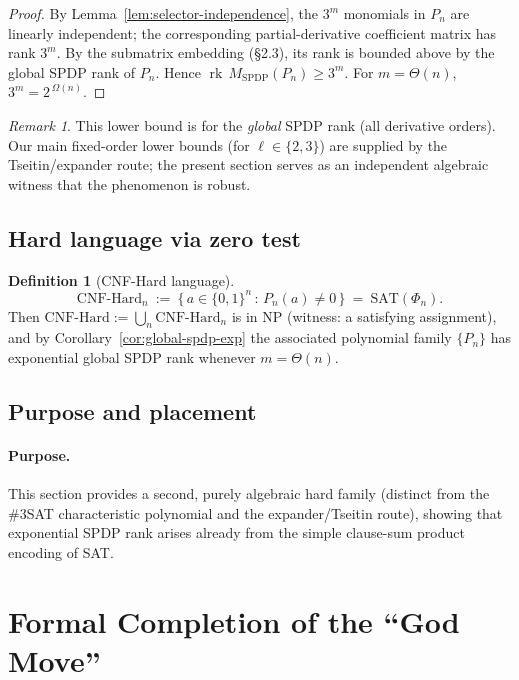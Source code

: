 \documentclass[12pt]{article}
\theoremstyle{definition}
\newtheorem{definition}{Definition}
\theoremstyle{definition}
\theoremstyle{remark}
\newtheorem{remark}{Remark}
\theoremstyle{remark}
\begin{document}
\begin{proof}
By Lemma~\ref{lem:selector-independence}, the $3^m$ monomials in $P_n$ are linearly independent; the corresponding partial-derivative coefficient matrix has rank $3^m$. By the submatrix embedding (\S2.3), its rank is bounded above by the global SPDP rank of $P_n$. Hence $\operatorname{rk}\,M_{\mathrm{SPDP}}(P_n)\ge 3^m$. For $m=\Theta(n)$, $3^m=2^{\,\Omega(n)}$.
\end{proof}

\begin{remark}
This lower bound is for the \emph{global} SPDP rank (all derivative orders). Our main fixed-order lower bounds (for $\ell\in\{2,3\}$) are supplied by the Tseitin/expander route; the present section serves as an independent algebraic witness that the phenomenon is robust.
\end{remark}

\subsection{Hard language via zero test}

\begin{definition}[CNF-Hard language]\label{def:cnf-hard-lang}
\[
\mathrm{CNF}\text{-}\mathrm{Hard}_n\ :=\ \bigl\{\,a\in\{0,1\}^n\,:\,P_n(a)\neq 0\,\bigr\}\ =\ \mathrm{SAT}(\Phi_n).
\]
Then $\mathrm{CNF}\text{-}\mathrm{Hard}:=\bigcup_n\mathrm{CNF}\text{-}\mathrm{Hard}_n$ is in NP (witness: a satisfying assignment), and by Corollary~\ref{cor:global-spdp-exp} the associated polynomial family $\{P_n\}$ has exponential global SPDP rank whenever $m=\Theta(n)$.
\end{definition}

\subsection{Purpose and placement}

\paragraph{Purpose.} This section provides a second, purely algebraic hard family (distinct from the \#3SAT characteristic polynomial and the expander/Tseitin route), showing that exponential SPDP rank arises already from the simple clause-sum product encoding of SAT.

\section{Formal Completion of the ``God Move''}
\label{sec:godmove}
\end{document}
